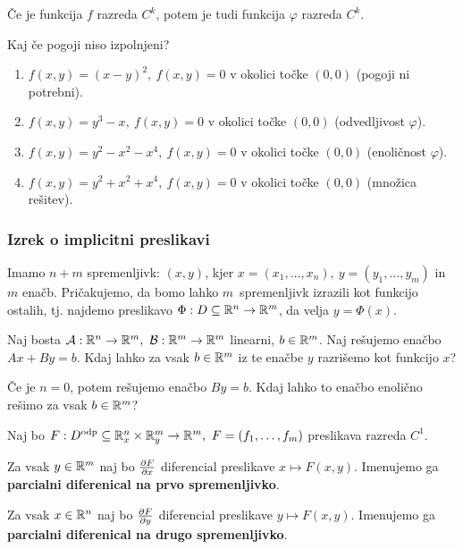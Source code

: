 \begin{posledica}
    Če je funkcija $f$ razreda $C^k$, potem je tudi funkcija $\varphi$ razreda $C^k$.
\end{posledica}

\begin{zgled}
    Kaj če pogoji niso izpolnjeni?
    \begin{enumerate}
        \item $f(x,y) = (x-y)^2, \ f(x,y) = 0$ v okolici točke $(0,0)$ (pogoji ni potrebni).
        \item $f(x,y) = y^3 - x, \ f(x,y) = 0$ v okolici točke $(0,0)$ (odvedljivost $\varphi$).
        \item $f(x,y) = y^2-x^2-x^4, \ f(x,y) = 0$ v okolici točke $(0,0)$ (enoličnost $\varphi$).
        \item $f(x,y) = y^2+x^2+x^4, \ f(x,y) = 0$ v okolici točke $(0,0)$ (množica rešitev).
    \end{enumerate}
\end{zgled}


\subsubsection{Izrek o implicitni preslikavi}
Imamo $n+m$ spremenljivk: $(x, y)$, kjer $x = (x_1, \ldots, x_n), \ y = (y_1, \ldots, y_m)$ in $m$ enačb. Pričakujemo, da bomo lahko $m$~spremenljivk izrazili kot funkcijo ostalih, tj. najdemo preslikavo $\Phi: D \subseteq \mathbb{R}^n \to \mathbb{R}^m$, da velja $y = \Phi(x)$.


\begin{primer}
    Naj bosta $\mathcal{A}: \mathbb{R}^n \to \mathbb{R}^m, \ \mathcal{B}: \mathbb{R}^m \to \mathbb{R}^m$ linearni, $b \in \mathbb{R}^m$. Naj rešujemo enačbo $Ax + By = b$. Kdaj lahko za vsak $b \in \mathbb{R}^m$ iz te  enačbe $y$ razrišemo kot funkcijo $x$? 

    Če je $n=0$, potem rešujemo enačbo $By = b$. Kdaj lahko to enačbo enolično rešimo za vsak $b \in \mathbb{R}^m$?
\end{primer}

Naj bo $F: D^\text{odp} \subseteq \mathbb{R}^n_x \times \mathbb{R}^m_y \to \mathbb{R}^m, \ F = (f_1, \ldots, f_m)$ preslikava razreda $C^1$. 

Za vsak $y \in \mathbb{R}^m$ naj bo $\frac{\partial F}{\partial x}$ diferencial preslikave $x \mapsto F(x,y)$. Imenujemo ga \textbf{parcialni diferenical na prvo spremenljivko}. 

Za vsak $x \in \mathbb{R}^n$ naj bo $\frac{\partial F}{\partial y}$ diferencial preslikave $y \mapsto F(x,y)$. Imenujemo ga \textbf{parcialni diferenical na drugo spremenljivko}. 

